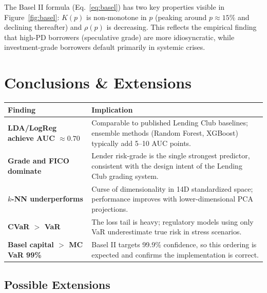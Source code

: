 \documentclass[12pt,a4paper]{article}
\begin{document}
The Basel II formula (Eq.~\eqref{eq:basel}) has two key properties visible in
Figure~\ref{fig:basel}: $K(p)$ is non-monotone in $p$ (peaking around $p \approx
15\%$ and declining thereafter) and $\rho(p)$ is decreasing. This reflects the
empirical finding that high-PD borrowers (speculative grade) are more idiosyncratic,
while investment-grade borrowers default primarily in systemic crises.

\section{Conclusions \& Extensions}

\begin{center}
\renewcommand{\arraystretch}{1.4}
\begin{tabular}{@{}>{\bfseries}p{4.5cm}p{9.5cm}@{}}
\toprule
\textbf{Finding} & \textbf{Implication} \\
\midrule
LDA/LogReg achieve AUC $\approx 0.70$ &
  Comparable to published Lending Club baselines; ensemble methods
  (Random Forest, XGBoost) typically add 5--10 AUC points. \\
Grade and FICO dominate &
  Lender risk-grade is the single strongest predictor, consistent with
  the design intent of the Lending Club grading system. \\
$k$-NN underperforms &
  Curse of dimensionality in 14D standardized space; performance
  improves with lower-dimensional PCA projections. \\
CVaR $>$ VaR &
  The loss tail is heavy; regulatory models using only VaR underestimate
  true risk in stress scenarios. \\
Basel capital $>$ MC VaR 99\% &
  Basel II targets 99.9\% confidence, so this ordering is expected
  and confirms the implementation is correct. \\
\bottomrule
\end{tabular}
\end{center}

\subsection{Possible Extensions}
\end{document}
